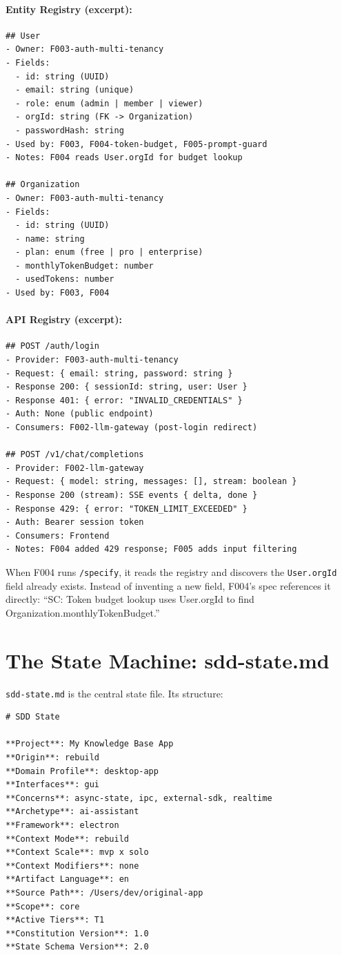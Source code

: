 \documentclass[11pt,a4paper,openright,twoside]{report}
\newcommand{\cmd}[1]{\texttt{/#1}}
\newcommand{\file}[1]{\texttt{#1}}
\begin{document}
\paragraph{Entity Registry (excerpt):}
\begin{lstlisting}
## User
- Owner: F003-auth-multi-tenancy
- Fields:
  - id: string (UUID)
  - email: string (unique)
  - role: enum (admin | member | viewer)
  - orgId: string (FK -> Organization)
  - passwordHash: string
- Used by: F003, F004-token-budget, F005-prompt-guard
- Notes: F004 reads User.orgId for budget lookup

## Organization
- Owner: F003-auth-multi-tenancy
- Fields:
  - id: string (UUID)
  - name: string
  - plan: enum (free | pro | enterprise)
  - monthlyTokenBudget: number
  - usedTokens: number
- Used by: F003, F004
\end{lstlisting}

\paragraph{API Registry (excerpt):}
\begin{lstlisting}
## POST /auth/login
- Provider: F003-auth-multi-tenancy
- Request: { email: string, password: string }
- Response 200: { sessionId: string, user: User }
- Response 401: { error: "INVALID_CREDENTIALS" }
- Auth: None (public endpoint)
- Consumers: F002-llm-gateway (post-login redirect)

## POST /v1/chat/completions
- Provider: F002-llm-gateway
- Request: { model: string, messages: [], stream: boolean }
- Response 200 (stream): SSE events { delta, done }
- Response 429: { error: "TOKEN_LIMIT_EXCEEDED" }
- Auth: Bearer session token
- Consumers: Frontend
- Notes: F004 added 429 response; F005 adds input filtering
\end{lstlisting}

When F004 runs \cmd{specify}, it reads the registry and discovers the \texttt{User.orgId} field already exists. Instead of inventing a new field, F004's spec references it directly: ``SC: Token budget lookup uses User.orgId to find Organization.monthlyTokenBudget.''

\section{The State Machine: sdd-state.md}

\file{sdd-state.md} is the central state file. Its structure:

\begin{lstlisting}[title={sdd-state.md Header Structure}]
# SDD State

**Project**: My Knowledge Base App
**Origin**: rebuild
**Domain Profile**: desktop-app
**Interfaces**: gui
**Concerns**: async-state, ipc, external-sdk, realtime
**Archetype**: ai-assistant
**Framework**: electron
**Context Mode**: rebuild
**Context Scale**: mvp x solo
**Context Modifiers**: none
**Artifact Language**: en
**Source Path**: /Users/dev/original-app
**Scope**: core
**Active Tiers**: T1
**Constitution Version**: 1.0
**State Schema Version**: 2.0
\end{lstlisting}
\end{document}
